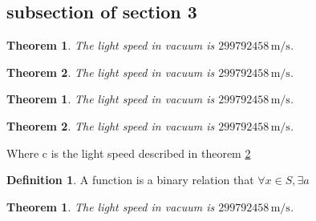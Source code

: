 \documentclass[11pt,oneside,a4paper]{article}
\begin{document}
\newtheorem{nikname}{Theorem}[subsection]
\newtheorem{Nikname}{Theorem}[section]
\newtheorem*{fikname}{Theorem}
\subsection{subsection of section 3}
\begin{nikname}
	\label{thm:lignt1}
	The light speed in vacuum is $299792458\,\mathrm{m/s}$.
\end{nikname}
\begin{nikname}
	\label{thm:light2}
	The light speed in vacuum is $299792458\,\mathrm{m/s}$.
\end{nikname}
\begin{Nikname}
	\label{thm:lignt3}
	The light speed in vacuum is $299792458\,\mathrm{m/s}$.
\end{Nikname}
\begin{Nikname}
	\label{thm:light4}
	The light speed in vacuum is $299792458\,\mathrm{m/s}$.
\end{Nikname}
Where c is the light speed described in theorem \ref{thm:light4}
\theoremstyle{definition} \newtheorem{Def}{Definition}[section]
\begin{Def}
	A function is a binary relation that $\forall x \in S, \exists a $
\end{Def}
\begin{fikname}
	\label{thm:light5}
	The light speed in vacuum is $299792458\,\mathrm{m/s}$.
\end{fikname}
\end{document}
